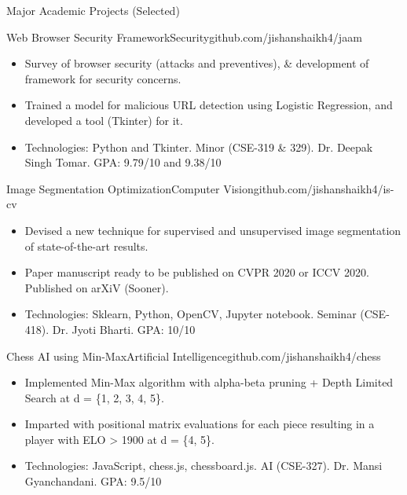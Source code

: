 \documentclass[]{mcdowellcv}
\begin{document}
	\begin{cvsection}{Major Academic Projects (Selected)}
		\begin{cvsubsection}{Web Browser Security Framework}{Security}{github.com/jishanshaikh4/jaam}	
			\begin{itemize}
				\item Survey of browser security (attacks and preventives), \& development of framework for security concerns.
				
				\item Trained a model for malicious URL detection using Logistic Regression, and developed a tool (Tkinter) for it.
				
				\item Technologies: Python and Tkinter.  Minor (CSE-319 \& 329). Dr. Deepak Singh Tomar. GPA: 9.79/10 and 9.38/10
			\end{itemize}
		\end{cvsubsection}
	
		\begin{cvsubsection}{Image Segmentation Optimization}{Computer Vision}{github.com/jishanshaikh4/is-cv}	
			\begin{itemize}
				\item Devised a new technique for supervised and unsupervised image segmentation of state-of-the-art results.
				
				\item Paper manuscript ready to be published on CVPR 2020 or ICCV 2020. Published on arXiV (Sooner).
				
				\item Technologies: Sklearn, Python, OpenCV, Jupyter notebook. Seminar (CSE-418). Dr. Jyoti Bharti. GPA: 10/10
			\end{itemize}
		\end{cvsubsection}
	
		\begin{cvsubsection}{Chess AI using Min-Max}{Artificial Intelligence}{github.com/jishanshaikh4/chess}	
			\begin{itemize}
				\item Implemented Min-Max algorithm with alpha-beta pruning + Depth Limited Search at d = \{1, 2, 3, 4, 5\}.
				
				\item Imparted with positional matrix evaluations for each piece resulting in a player with ELO > 1900 at d = \{4, 5\}.
				
				\item Technologies: JavaScript, chess.js, chessboard.js. AI (CSE-327). Dr. Mansi Gyanchandani. GPA: 9.5/10
			\end{itemize}
		\end{cvsubsection}
	

\end{cvsection}
\end{document}
